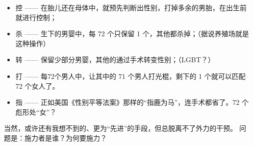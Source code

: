 \begin{itemize}[nosep, left=\parindent]
    \item 控 —— 在胎儿还在母体中，就预先判断出性别，打掉多余的男胎，在出生前就进行控制；
    \item 杀 —— 生下的男婴中，每 72 个只保留 1 个，其他都杀掉；（据说养殖场就是这种操作）
    \item 转 —— 保留少部分男婴，其他的通过手术转变性别；（LGBT？）
    \item 打 —— 每72个男人中，让其中的 71 个男人打光棍，剩下的 1 个就可以匹配 72 个女人了。
    \item 指 —— 正如美国《性别平等法案》那样的“指鹿为马”，连手术都省了。72 个彪形处“女”？
\end{itemize}

当然，或许还有我想不到的、更为“先进”的手段，但总脱离不了外力的干预。
问题是：施力者是谁？为何要施力？


